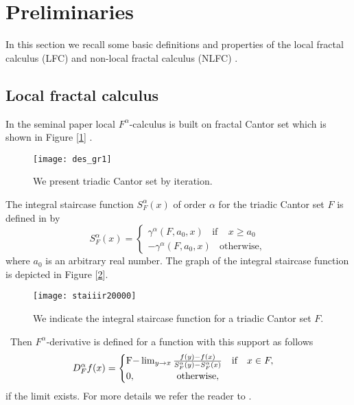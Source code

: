 \documentclass[12pt]{article}
\begin{document}
\section{Preliminaries\label{2-sec}}
In this section we recall some basic definitions and properties of  the local fractal calculus (LFC) and non-local fractal calculus (NLFC) \cite{ab12,Golmankhaneh-107-k}.

\subsection{Local fractal calculus}
In the seminal paper local $F^{\alpha}$-calculus is built on fractal Cantor set which is shown in Figure [\ref{422vgtweqavdrb}] \cite{ab12}.
\begin{figure}[H]
  \centering
  \texttt{[image: des\_gr1]}
  \caption{We present  triadic Cantor set by iteration.}\label{422vgtweqavdrb}
\end{figure}
The integral staircase function $S_{F}^{\alpha}(x)$ of order
$\alpha$ for the triadic Cantor set $F$ is defined in  \cite{ab12} by
\begin{equation}\label{t}
    S_{F}^{\alpha}(x)=\begin{cases}
    \gamma^{\alpha}(F,a_{0},x) ~~~~\text{if} ~~~~~x\geq a_{0}\\
    -\gamma^{\alpha}(F,a_{0},x) ~~~~\text{otherwise},
\end{cases}
\end{equation}
where $a_{0}$ is an arbitrary real number. The graph of the integral staircase function is depicted in Figure [\ref{42des2vdrb}].
\begin{figure}[H]
  \centering
  \texttt{[image: staiiir20000]}
  \caption{We indicate  the integral staircase function  for a triadic  Cantor set $F$. }\label{42des2vdrb}
\end{figure}
~Then $F^{\alpha}$-derivative is defined  for a function with this support as follows
 \cite{ab12}
\begin{equation}
    D_{F}^{\alpha}f(x)=\begin{cases}
    $F$-\lim_{y\rightarrow x} \frac{f(y)-f(x)}{S_{F}^{\alpha}(y)-S_{F}^
    {\alpha}(x)} ~~~\text{if} ~~~x\in F,\\
    0, ~~~~~~~~~~~~~\textmd{otherwise},
    \end{cases}
 \end{equation}
if the limit exists. For more details we refer the reader to \cite{ab12}.\\
\end{document}

